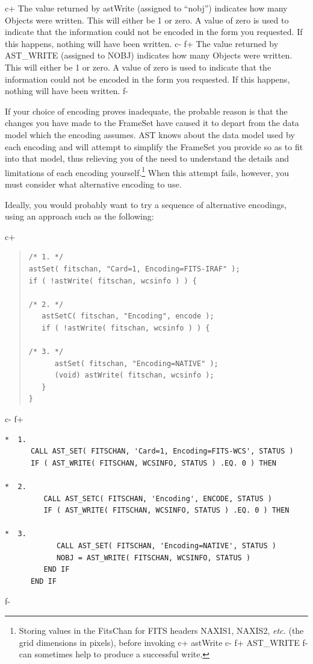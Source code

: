 \documentclass[twoside,11pt]{article}
\begin{document}
c+
The value returned by astWrite (assigned to ``nobj'') indicates how
many Objects were written. This will either be 1 or zero. A value of
zero is used to indicate that the information could not be encoded in
the form you requested. If this happens, nothing will have been
written.
c-
f+
The value returned by AST\_WRITE (assigned to NOBJ) indicates how many
Objects were written. This will either be 1 or zero. A value of zero
is used to indicate that the information could not be encoded in the
form you requested. If this happens, nothing will have been written.
f-

If your choice of encoding proves inadequate, the probable reason is
that the changes you have made to the FrameSet have caused it to
depart from the data model which the encoding assumes.  AST knows
about the data model used by each encoding and will attempt to
simplify the FrameSet you provide so as to fit into that model, thus
relieving you of the need to understand the details and limitations of
each encoding yourself.\footnote{Storing values in the FitsChan for
FITS headers NAXIS1, NAXIS2, {\em{etc.}} (the grid dimensions in pixels),
before invoking
c+
astWrite
c-
f+
AST\_WRITE
f-
can sometimes help to produce a successful write.} When this attempt fails,
however, you must consider what alternative encoding to use.

Ideally, you would probably want to try a sequence of alternative
encodings, using an approach such as the following:

c+
\begin{quote}
\small
\begin{verbatim}
/* 1. */
astSet( fitschan, "Card=1, Encoding=FITS-IRAF" );
if ( !astWrite( fitschan, wcsinfo ) ) {

/* 2. */
   astSetC( fitschan, "Encoding", encode );
   if ( !astWrite( fitschan, wcsinfo ) ) {

/* 3. */
      astSet( fitschan, "Encoding=NATIVE" );
      (void) astWrite( fitschan, wcsinfo );
   }
}
\end{verbatim}
\normalsize
\end{quote}
c-
f+
\small
\begin{verbatim}
*  1.
      CALL AST_SET( FITSCHAN, 'Card=1, Encoding=FITS-WCS', STATUS )
      IF ( AST_WRITE( FITSCHAN, WCSINFO, STATUS ) .EQ. 0 ) THEN

*  2.
         CALL AST_SETC( FITSCHAN, 'Encoding', ENCODE, STATUS )
         IF ( AST_WRITE( FITSCHAN, WCSINFO, STATUS ) .EQ. 0 ) THEN

*  3.
            CALL AST_SET( FITSCHAN, 'Encoding=NATIVE', STATUS )
            NOBJ = AST_WRITE( FITSCHAN, WCSINFO, STATUS )
         END IF
      END IF
\end{verbatim}
\normalsize
f-
\end{document}
